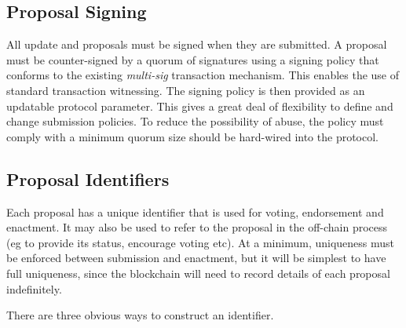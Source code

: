 \subsection{Proposal Signing}

All update and proposals must be signed when they are submitted.  A proposal must be counter-signed by a quorum of signatures using a signing
policy that conforms to the existing \emph{multi-sig} transaction mechanism.  This enables the use of standard transaction witnessing.
The signing policy is then provided as an updatable protocol parameter.  This gives a great deal of flexibility to define and change submission policies.
To reduce the possibility of abuse, the policy must comply with a minimum quorum size should be hard-wired into the protocol.



\subsection{Proposal Identifiers}
\label{sect:proposalid}

Each proposal has a unique identifier that is used for voting, endorsement and enactment.  It may also be used to refer to the proposal in the off-chain process (eg to provide its
status, encourage voting etc).  At a minimum, uniqueness must be enforced between submission and enactment, but it will be simplest to have full uniqueness, since the blockchain will need to record
details of each proposal indefinitely.

There are three obvious ways to construct an identifier.

